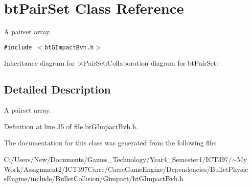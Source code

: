 \hypertarget{classbt_pair_set}{
\section{btPairSet Class Reference}
\label{classbt_pair_set}
}
A pairset array.  


{\tt \#include $<$btGImpactBvh.h$>$}

Inheritance diagram for btPairSet:Collaboration diagram for btPairSet:

\subsection{Detailed Description}
A pairset array. 

Definition at line 35 of file btGImpactBvh.h.

The documentation for this class was generated from the following file:\begin{CompactItemize}
\item 
C:/Users/New/Documents/Games\_\-Technology/Year4\_\-Semester1/ICT397/$\sim$My Work/Assignment2/ICT397Carre/CarreGameEngine/Dependencies/BulletPhysicsEngine/include/BulletCollision/Gimpact/btGImpactBvh.h\end{CompactItemize}
